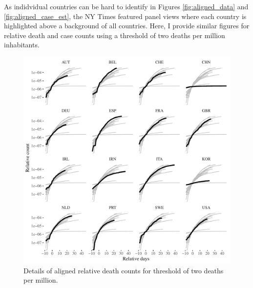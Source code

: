 \documentclass[fullpage,a4paper]{article}
\begin{document}
As indidvidual countries can be hard to identify in Figures
\ref{fig:aligned_data} and \ref{fig:aligned_case_est}, the NY Times
featured panel views where each country is highlighted above a
background of all countries. Here, I provide similar figures for
relative death and case counts using a threshold of two deaths per
million inhabitants.
\begin{figure}
  \includegraphics[width=1\textwidth]{../figs/ecdc_aligned_twopermill_nyt.pdf}
  \caption{\label{fig:align_nyt} Details of aligned relative death
    counts for threshold of two deaths per million.}
\end{figure}
\end{document}
